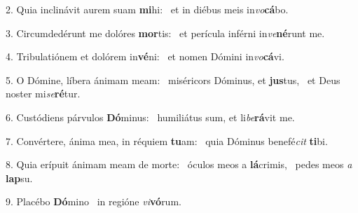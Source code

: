 2. Quia inclinávit aurem suam \textbf{mi}hi: \ast\  et in diébus meis in\textit{vo}\textbf{cá}bo.\

3. Circumdedérunt me dolóres \textbf{mor}tis: \ast\  et perícula inférni in\textit{ve}\textbf{né}runt me.\

4. Tribulatiónem et dolórem in\textbf{vé}ni: \ast\  et nomen Dómini in\textit{vo}\textbf{cá}vi.\

5. O Dómine, líbera ánimam meam: \dag\  miséricors Dóminus, et \textbf{jus}tus, \ast\  et Deus noster mi\textit{se}\textbf{ré}tur.\

6. Custódiens párvulos \textbf{Dó}minus: \ast\  humiliátus sum, et li\textit{be}\textbf{rá}vit me.\

7. Convértere, ánima mea, in réquiem \textbf{tu}am: \ast\  quia Dóminus benefé\textit{cit} \textbf{ti}bi.\

8. Quia erípuit ánimam meam de morte: \dag\  óculos meos a \textbf{lá}crimis, \ast\  pedes meos \textit{a} \textbf{lap}su.\

9. Placébo \textbf{Dó}mino \ast\  in regióne \textit{vi}\textbf{vó}rum.\

